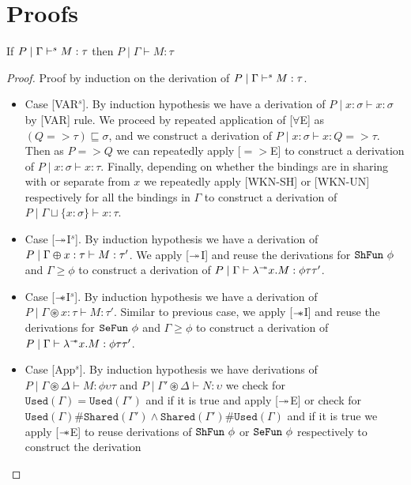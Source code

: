 \chapter{Proofs}
\begin{theorem}\label{thm:soundness-syntax-directed}
   If $P \mid \Gamma \vdash^s M:\tau$ then $P \mid \Gamma \vdash M:\tau$
\end{theorem}
\begin{proof}\label{prf:soundness-syntax-directed}
  Proof by induction on the derivation of $P \mid \Gamma \vdash^s M:\tau$.
  \begin{itemize}
  \item{Case [VAR$^s$].}
    By induction hypothesis we have a derivation of $P \mid x:\sigma \vdash x:\sigma$ by [VAR] rule.
    We proceed by repeated application of [$\forall$E] as $(Q => \tau) \sqsubseteq \sigma$, and
    we construct a derivation of $P \mid x:\sigma \vdash x: Q => \tau$. Then as $P => Q$ we can
    repeatedly apply [$=>$E] to construct a derivation of $P \mid x:\sigma \vdash x:\tau$.
    Finally, depending on whether the bindings are in sharing with or separate from
    $x$ we repeatedly apply [WKN-SH] or [WKN-UN] respectively for all the bindings in $\Gamma$ to construct
    a derivation of $P \mid \Gamma \sqcup \{x:\sigma\} \vdash x:\tau$.
  \item{Case [$\twoheadrightarrow$I$^s$].}
    By induction hypothesis we have a derivation of $P \mid \Gamma \varoplus x:\tau \vdash M:\tau'$.
    We apply [$\twoheadrightarrow$I] and reuse the derivations for $\texttt{ShFun}\ \phi$ and $\Gamma \geq \phi$  to
    construct a derivation of $P \mid \Gamma \vdash \lambda^{\twoheadrightarrow}x. M: \phi \tau \tau'$.
  \item{Case [$\mathrel{-\mkern-6mu*}$I$^s$].}
    By induction hypothesis we have a derivation of $P \mid \Gamma \circledast x:\tau \vdash M:\tau'$.
    Similar to previous case, we apply [$\mathrel{-\mkern-6mu*}$I] and reuse the derivations for $\texttt{SeFun}\ \phi$ and $\Gamma \geq \phi$  to
    construct a derivation of $P \mid \Gamma \vdash \lambda^{\mathrel{-\mkern-6mu*}}x. M: \phi \tau \tau'$.
  \item{Case [App$^s$].}
    By induction hypothesis we have derivations of $P \mid \Gamma \circledast \Delta \vdash M: \phi \upsilon \tau$ and
    $P \mid \Gamma' \circledast \Delta \vdash N: \upsilon$ we check for $\texttt{Used}(\Gamma) = \texttt{Used}(\Gamma')$ and if it is true
    and apply [$\twoheadrightarrow$E] or check for $\texttt{Used}(\Gamma)\#\texttt{Shared}(\Gamma') \wedge \texttt{Shared}(\Gamma')\#\texttt{Used}(\Gamma)$
    and if it is true we apply [$\mathrel{-\mkern-6mu*}$E] to reuse derivations of $\texttt{ShFun}\ \phi$ or $\texttt{SeFun}\ \phi$ respectively to construct the derivation

\end{itemize}
\end{proof}
